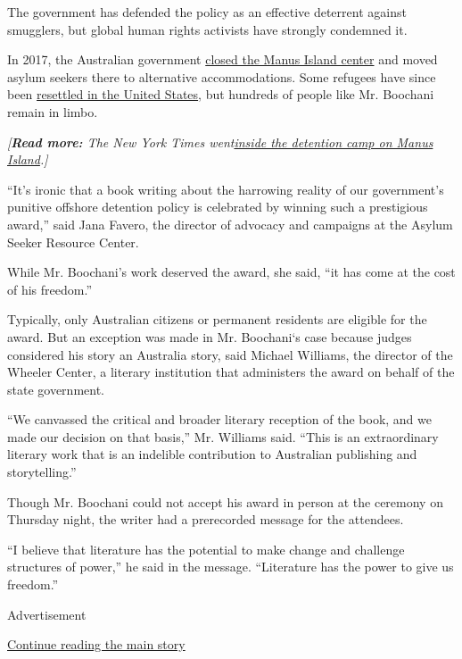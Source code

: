 The government has defended the policy as an effective deterrent against
smugglers, but global human rights activists have strongly condemned it.

In 2017, the Australian government
\href{https://www.nytimes.com/2017/11/02/world/australia/manus-island-refugees.html}{closed
the Manus Island center} and moved asylum seekers there to alternative
accommodations. Some refugees have since been
\href{https://www.nytimes.com/2018/01/23/world/australia/manus-refugees-trump.html}{resettled
in the United States}, but hundreds of people like Mr. Boochani remain
in limbo.

\emph{{[}\emph{\emph{\textbf{Read more:}} \emph{The New York Times
went}\href{https://www.nytimes.com/interactive/2017/11/18/world/australia/manus-island-australia-detainees.html}{\emph{inside
the detention camp on Manus Island}}}.{]}}

``It's ironic that a book writing about the harrowing reality of our
government's punitive offshore detention policy is celebrated by winning
such a prestigious award,'' said Jana Favero, the director of advocacy
and campaigns at the Asylum Seeker Resource Center.

While Mr. Boochani's work deserved the award, she said, ``it has come at
the cost of his freedom.''

Typically, only Australian citizens or permanent residents are eligible
for the award. But an exception was made in Mr. Boochani`s case because
judges considered his story an Australia story, said Michael Williams,
the director of the Wheeler Center, a literary institution that
administers the award on behalf of the state government.

``We canvassed the critical and broader literary reception of the book,
and we made our decision on that basis,'' Mr. Williams said. ``This is
an extraordinary literary work that is an indelible contribution to
Australian publishing and storytelling.''

Though Mr. Boochani could not accept his award in person at the ceremony
on Thursday night, the writer had a prerecorded message for the
attendees.

``I believe that literature has the potential to make change and
challenge structures of power,'' he said in the message. ``Literature
has the power to give us freedom.''

Advertisement

\protect\hyperlink{after-bottom}{Continue reading the main story}

